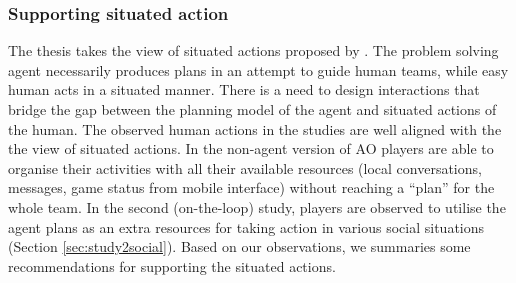 \subsubsection{Supporting situated action}\label{sec:conclusionSituatedAction}
The thesis takes the view of situated actions proposed by \cite{Suchman1987}. The problem solving agent necessarily produces plans in an attempt to guide human teams, while easy  human acts in a situated manner. There is a need to design interactions that bridge the gap between the planning model of the agent and situated actions of the human. The observed human actions in the studies are well aligned with the the view of situated actions. In the non-agent version of \ac{AO} players are able to organise their activities with all their available resources (local conversations, messages, game status from mobile interface) without reaching a ``plan'' for the whole team.  In the second (on-the-loop) study, players are observed to utilise the agent plans as an extra resources for taking action in various social situations (Section \ref{sec:study2social}). Based on our observations, we summaries some recommendations for supporting the situated actions. \\

